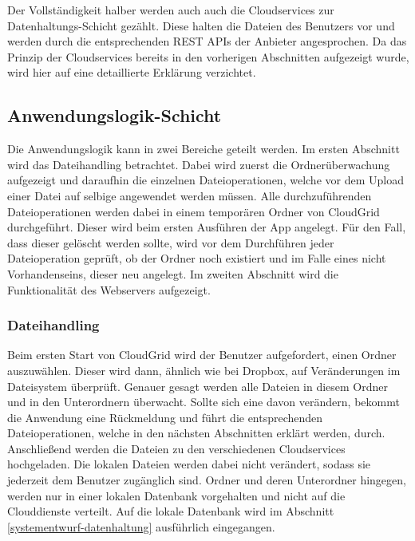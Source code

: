 Der Vollständigkeit halber werden auch auch die Cloudservices zur Datenhaltungs-Schicht gezählt.
Diese halten die Dateien des Benutzers vor und werden durch die entsprechenden \ac{REST} \acp{API} der Anbieter angesprochen.
Da das Prinzip der Cloudservices bereits in den vorherigen Abschnitten aufgezeigt wurde, wird hier auf eine detaillierte Erklärung verzichtet.

\subsection{Anwendungslogik-Schicht}
\label{systementwurf-anwendungslogik}
Die Anwendungslogik kann in zwei Bereiche geteilt werden.
Im ersten Abschnitt wird das Dateihandling betrachtet.
Dabei wird zuerst die Ordnerüberwachung aufgezeigt und daraufhin die einzelnen Dateioperationen, welche vor dem Upload einer Datei auf selbige angewendet werden müssen.
Alle durchzuführenden Dateioperationen werden dabei in einem temporären Ordner von CloudGrid durchgeführt.
Dieser wird beim ersten Ausführen der \ac{App} angelegt.
Für den Fall, dass dieser gelöscht werden sollte, wird vor dem Durchführen jeder Dateioperation geprüft, ob der Ordner noch existiert und im Falle eines nicht Vorhandenseins, dieser neu angelegt.
Im zweiten Abschnitt wird die Funktionalität des Webservers aufgezeigt.

\subsubsection{Dateihandling}
\label{systementwurf-dateihandling}
Beim ersten Start von CloudGrid wird der Benutzer aufgefordert, einen Ordner auszuwählen.
Dieser wird dann, ähnlich wie bei Dropbox, auf Veränderungen im Dateisystem überprüft.
Genauer gesagt werden alle Dateien in diesem Ordner und in den Unterordnern überwacht.
Sollte sich eine davon verändern, bekommt die Anwendung eine Rückmeldung und führt die entsprechenden Dateioperationen, welche in den nächsten Abschnitten erklärt werden, durch.
Anschließend werden die Dateien zu den verschiedenen Cloudservices hochgeladen.
Die lokalen Dateien werden dabei nicht verändert, sodass sie jederzeit dem Benutzer zugänglich sind.
Ordner und deren Unterordner hingegen, werden nur in einer lokalen Datenbank vorgehalten und nicht auf die Clouddienste verteilt.
Auf die lokale Datenbank wird im Abschnitt \ref{systementwurf-datenhaltung} ausführlich eingegangen.

